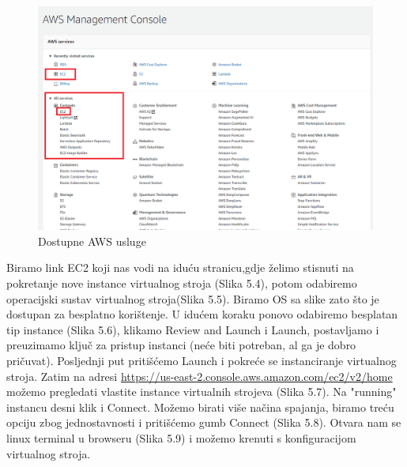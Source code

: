 			\begin{figure}[h]
				\includegraphics[scale=0.5]{slike/deployment_slike/awshome.png}
				\centering
				\caption{Dostupne AWS usluge}
				
			\end{figure}
		
			Biramo link EC2  koji nas vodi na iduću stranicu,gdje želimo stisnuti na pokretanje nove instance virtualnog stroja (Slika 5.4), potom odabiremo operacijski sustav virtualnog stroja(Slika 5.5). Biramo OS sa slike zato što je dostupan za besplatno korištenje. U idućem koraku ponovo odabiremo besplatan tip instance (Slika 5.6), klikamo Review and Launch i Launch, postavljamo i preuzimamo ključ za pristup instanci (neće biti potreban, al ga je dobro pričuvat). Posljednji put pritišćemo Launch i pokreće se instanciranje virtualnog stroja. Zatim na adresi \url{https://us-east-2.console.aws.amazon.com/ec2/v2/home} možemo pregledati vlastite instance virtualnih strojeva (Slika 5.7). Na "running" instancu desni klik i Connect. Možemo birati više načina spajanja, biramo treću opciju zbog jednostavnosti i pritišćemo gumb Connect (Slika 5.8). Otvara nam se linux terminal u browseru (Slika 5.9) i možemo krenuti s konfiguracijom virtualnog stroja.
			
